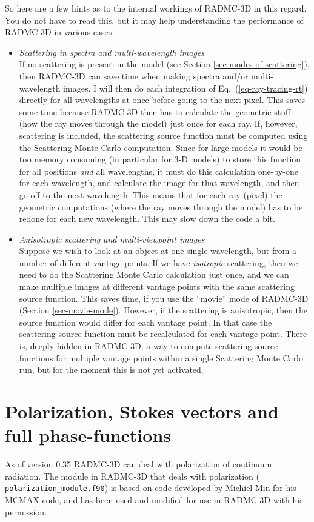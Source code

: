 \documentclass{report}
\begin{document}
So here are a few hints as to the internal workings of RADMC-3D in this
regard. You do not have to read this, but it may help understanding the
performance of RADMC-3D in various cases.
\begin{itemize}
\item {\em Scattering in spectra and multi-wavelength images}\\
  If no scattering is present in the model (see Section
  \ref{sec-modes-of-scattering}), then RADMC-3D can save time when making
  spectra and/or multi-wavelength images. I will then do each integration of
  Eq.~(\ref{eq-ray-tracing-rt}) directly for all wavelengths at once before
  going to the next pixel. This saves some time because RADMC-3D then has to
  calculate the geometric stuff (how the ray moves through the model) just
  once for each ray. If, however, scattering is included, the scattering
  source function must be computed using the Scattering Monte Carlo 
  computation. Since for large models it would be too memory consuming
  (in particular for 3-D models) to store this function for all positions
  {\em and} all wavelengths, it must do this calculation one-by-one for
  each wavelength, and calculate the image for that wavelength, and then
  go off to the next wavelength. This means that for each ray (pixel) the
  geometric computations (where the ray moves through the model) has to
  be redone for each new wavelength. This may slow down the code a bit.
\item {\em Anisotropic scattering and multi-viewpoint images}\\
  Suppose we wish to look at an object at one single wavelength, but from a
  number of different vantage points. If we have {\em isotropic} scattering,
  then we need to do the Scattering Monte Carlo calculation just once, and
  we can make multiple images at different vantage points with the same
  scattering source function. This saves time, if you use the ``movie'' mode
  of RADMC-3D (Section \ref{sec-movie-mode}). However, if the scattering is
  anisotropic, then the source function would differ for each vantage point.
  In that case the scattering source function must be recalculated for each
  vantage point. There is, deeply hidden in RADMC-3D, a way to compute
  scattering source functions for multiple vantage points within a single
  Scattering Monte Carlo run, but for the moment this is not yet activated.
\end{itemize}


\section{Polarization, Stokes vectors and full phase-functions}
\label{sec-polarized-scattering}
%
As of version 0.35 RADMC-3D can deal with polarization of continuum
radiation. The module in RADMC-3D that deals with polarization ({\small\tt
  polarization\_module.f90}) is based on code developed by Michiel Min for
his MCMAX code, and has been used and modified for use in
RADMC-3D with his permission.
\end{document}
